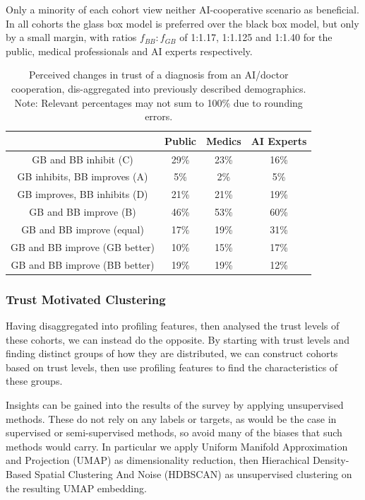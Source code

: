 \documentclass[manuscript,screen,review]{acmart}
\begin{document}
Only a minority of each cohort view neither AI-cooperative scenario as beneficial. In all cohorts the glass box model is preferred over the black box model, but only by a small margin, with ratios $f_{BB}:f_{GB}$ of 1:1.17, 1:1.125 and 1:1.40 for the public, medical professionals and AI experts respectively. 

\begin{table}[h]
\begin{tabular}{c||c|c|c}
     & Public & Medics & AI Experts \\
     \hline \hline
    GB and BB inhibit (C)            & 29\% & 23\% & 16\%\\ \hline
    GB inhibits, BB improves (A)     & 5\%  & 2\%  & 5\% \\
    GB improves, BB inhibits (D)     & 21\% & 21\% & 19\%\\  \hline
    GB and BB improve (B)            & 46\% & 53\% & 60\%\\ \hline
    GB and BB improve (equal)        & 17\% & 19\% & 31\%\\
    GB and BB improve (GB better)    & 10\% & 15\% & 17\%\\
    GB and BB improve (BB better)    & 19\% & 19\% & 12\%\\ 
\end{tabular}
\caption{\label{tab:demographic_trust_change}Perceived changes in trust of a diagnosis from an AI/doctor cooperation, dis-aggregated into previously described demographics. Note: Relevant percentages may not sum to 100\% due to rounding errors.}
\end{table}

\subsubsection{Trust Motivated Clustering}

Having disaggregated into profiling features, then analysed the trust levels of these cohorts, we can instead do the opposite. By starting with trust levels and finding distinct groups of how they are distributed, we can construct cohorts based on trust levels, then use profiling features to find the characteristics of these groups.

Insights can be gained into the results of the survey by applying unsupervised methods. These do not rely on any labels or targets, as would be the case in supervised or semi-supervised methods, so avoid many of the biases that such methods would carry. In particular we apply Uniform Manifold Approximation and Projection (UMAP) \cite{McInnes2018} as dimensionality reduction, then Hierachical Density-Based Spatial Clustering And Noise (HDBSCAN) \cite{McInnes2017} as unsupervised clustering on the resulting UMAP embedding. 
\end{document}
